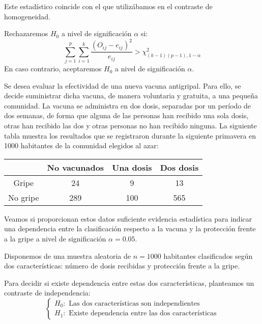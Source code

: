 \begin{remark}
    Este estadístico coincide con el que utilizábamos en el contraste de homogeneidad.
\end{remark}

Rechazaremos $H_0$ a nivel de significación $\alpha$ si:
$$\sum_{j=1}^p \sum_{i=1}^k \frac{(O_{ij}-e_{ij})^2}{e_{ij}} > \chi^2_{(k-1)(p-1), 1-\alpha}$$
En caso contrario, aceptaremos $H_0$ a nivel de significación $\alpha$.

\begin{example}
    Se desea evaluar la efectividad de una nueva vacuna antigripal. Para ello, se decide suministrar dicha vacuna, de manera voluntaria y gratuita, a una pequeña comunidad.
    La vacuna se administra en dos dosis, separadas por un período de dos semanas, de forma que alguna de las personas han recibido una sola dosis, otras han recibido las dos y otras personas no han recibido ninguna.
    La siguiente tabla muestra los resultados que se registraron durante la siguiente primavera en 1000 habitantes de la comunidad elegidos al azar:
    \begin{center}
        \begin{tabular}{| c | c c c |}
            \hline
                     & No vacunados & Una dosis & Dos dosis \\
            \hline
            Gripe    & 24           & 9         & 13        \\
            No gripe & 289          & 100       & 565       \\
            \hline
        \end{tabular}
    \end{center}
    Veamos si proporcionan estos datos suficiente evidencia estadística para indicar una dependencia entre la clasificación respecto a la vacuna y la protección frente a la gripe a nivel de significación $\alpha = 0.05$.

    Disponemos de una muestra aleatoria de $n = 1000$ habitantes clasificados según dos características: número de dosis recibidas y protección frente a la gripe.

    Para decidir si existe dependencia entre estas dos características, planteamos un contraste de independencia:
    $$\begin{cases}
            H_0: \text{ Las dos características son independientes} \\
            H_1: \text{ Existe dependencia entre las dos características}
        \end{cases}$$


\end{example}
